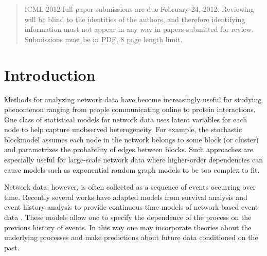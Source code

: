 \documentclass{article}
\begin{document}
 


\begin{abstract} 
ICML 2012 full paper submissions are due February 24, 2012. Reviewing will
be blind to the identities of the authors, and therefore identifying
information must not appear in any way in papers submitted for review. Submissions must be in PDF, 8 page length limit.
\end{abstract} 

\pagestyle{empty}

\section{Introduction}

Methods for analyzing network data have become increasingly useful for studying  phenomenon ranging from people communicating online to protein interactions. One class of statistical models for network data uses latent variables for each node to help capture unobserved heterogeneity.  For example, the stochastic blockmodel \cite{Nowicki2001, Kemp} assumes each node in the network belongs to some block (or cluster) and parametrizes the probability of edges between blocks.   Such approaches are especially useful for large-scale network data where higher-order dependencies can cause models such as exponential random graph models to be too complex to fit.

Network data, however, is often collected as a sequence of events occurring over time.   Recently several works have adapted models from survival analysis and event history analysis to provide continuous time models of network-based event data \cite{Butts2008,Brandes2009,Perry2011,Stadtfeld2010,Stadtfeld2011,Opsahl2011,Vu2011,Vu2011a}.  These models allow one to specify the dependence of the process on the previous history of events.  In this way one may incorporate theories about the underlying processes and make predictions about future data conditioned on the past.
\end{document}
